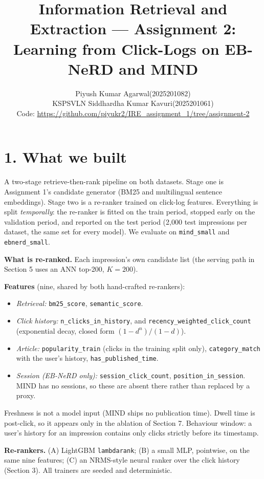 \documentclass[11pt,a4paper]{article}
\title{\textbf{Information Retrieval and Extraction --- Assignment 2:\\Learning from Click-Logs on EB-NeRD and MIND}}
\author{Piyush Kumar Agarwal(2025201082) \\KSPSVLN Siddhardha Kumar Kavuri(2025201061) \\ [0.4em]
\normalsize Code: \protect\url{https://github.com/piyukr2/IRE_assignment_1/tree/assignment-2}}
\date{}
\begin{document}
\maketitle

\section*{1. What we built}

A two-stage retrieve-then-rank pipeline on both datasets. Stage one is
Assignment 1's candidate generator (BM25 and multilingual sentence embeddings).
Stage two is a re-ranker trained on click-log features. Everything is split
\emph{temporally}: the re-ranker is fitted on the train period, stopped early on
the validation period, and reported on the test period (2{,}000 test impressions
per dataset, the same set for every model). We evaluate on \texttt{mind\_small}
and \texttt{ebnerd\_small}.

\textbf{What is re-ranked.} Each impression's own candidate list (the serving path in Section 5 uses an ANN top-200, $K=200$).

\textbf{Features} (nine, shared by both hand-crafted re-rankers):
\begin{itemize}\itemsep0pt
\item \emph{Retrieval:} \texttt{bm25\_score}, \texttt{semantic\_score}.
\item \emph{Click history:} \texttt{n\_clicks\_in\_history}, and
  \texttt{recency\_weighted\_click\_count} (exponential decay, closed form
  $(1-d^{n})/(1-d)$).
\item \emph{Article:} \texttt{popularity\_train} (clicks in the training split
  only), \texttt{category\_match} with the user's history, \texttt{has\_published\_time}.
\item \emph{Session (EB-NeRD only):} \texttt{session\_click\_count},
  \texttt{position\_in\_session}. MIND has no sessions, so these are absent there
  rather than replaced by a proxy.
\end{itemize}
Freshness is not a model input (MIND ships no publication time). Dwell time is post-click, so it appears only in the ablation of Section 7.
Behaviour window: a user's history for an impression contains only clicks strictly before its timestamp.

\textbf{Re-rankers.} (A) LightGBM \texttt{lambdarank}; (B) a small MLP, pointwise, on the same nine features; (C) an NRMS-style neural ranker over the click history (Section 3). All trainers are seeded and deterministic.
\end{document}
